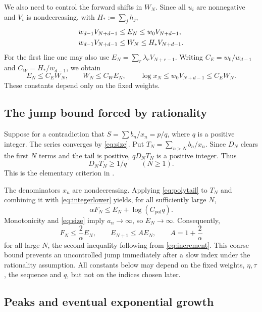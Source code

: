 \documentclass[11pt]{article}
\numberwithin{equation}{section}
\begin{document}
We also need to control the forward shifts in $W_N$. Since all $u_i$
are nonnegative and $V_i$ is nondecreasing, with $H_*:=\sum_jh_j$,
\begin{align}
  w_{d-1}V_{N+d-1}&\le E_N\le w_0V_{N+d-1},\notag\\
  w_{d-1}V_{N+d-1}&\le W_N\le H_*V_{N+d-1}. \label{eq:compare}
\end{align}
For the first line one may also use
$E_N=\sum_r\lambda_rV_{N+r-1}$.
Writing $C_E=w_0/w_{d-1}$ and $C_W=H_*/w_{d-1}$, we obtain
\begin{equation}\label{eq:EW}
  E_N\le C_EW_N,\qquad W_N\le C_WE_N,\qquad
  \log x_N\le w_0V_{N+d-1}\le C_EW_N.
\end{equation}
These constants depend only on the fixed weights.

\subsection{The jump bound forced by rationality}

Suppose for a contradiction that $S=\sum b_n/x_n=p/q$, where $q$ is a
positive integer. The series converges by \eqref{eq:size}. Put
$T_N=\sum_{n>N}b_n/x_n$. Since $D_N$ clears the first $N$ terms and
the tail is positive, $qD_NT_N$ is a positive integer. Thus
\begin{equation}\label{eq:integerlower}
  D_NT_N\ge 1/q \qquad(N\ge1).
\end{equation}
This is the elementary criterion in \cite[Lemma~8]{BKKKZ}.

The denominators $x_n$ are nondecreasing. Applying
\eqref{eq:polytail} to $T_N$ and combining it with
\eqref{eq:integerlower} yields, for all sufficiently large $N$,
\[
  \alpha F_N\le E_N+\log(C_{\mathrm{pol}}q).
\]
Monotonicity and \eqref{eq:size} imply $a_n\to\infty$, so $E_N\to\infty$.
Consequently,
\begin{equation}\label{eq:jump}
  F_N\le \frac2\alpha E_N,\qquad
  E_{N+1}\le A E_N,\qquad A=1+\frac2\alpha
\end{equation}
for all large $N$, the second inequality following from
\eqref{eq:increment}. This coarse bound prevents an uncontrolled jump
immediately after a slow index under the rationality assumption.
All constants below may depend on the fixed weights, $\eta,\tau$,
the sequence and $q$, but not on the indices chosen later.

\subsection{Peaks and eventual exponential growth}
\end{document}

